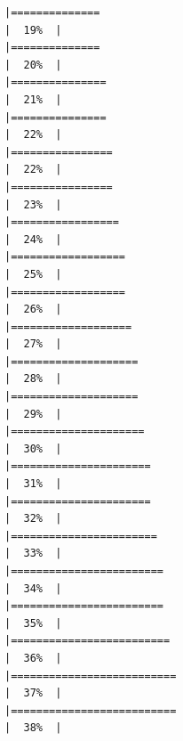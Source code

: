 \documentclass[
]{article}
\begin{document}
\begin{verbatim}
|==============                                                        |  19%  |                                                                              |==============                                                        |  20%  |                                                                              |===============                                                       |  21%  |                                                                              |===============                                                       |  22%  |                                                                              |================                                                      |  22%  |                                                                              |================                                                      |  23%  |                                                                              |=================                                                     |  24%  |                                                                              |==================                                                    |  25%  |                                                                              |==================                                                    |  26%  |                                                                              |===================                                                   |  27%  |                                                                              |====================                                                  |  28%  |                                                                              |====================                                                  |  29%  |                                                                              |=====================                                                 |  30%  |                                                                              |======================                                                |  31%  |                                                                              |======================                                                |  32%  |                                                                              |=======================                                               |  33%  |                                                                              |========================                                              |  34%  |                                                                              |========================                                              |  35%  |                                                                              |=========================                                             |  36%  |                                                                              |==========================                                            |  37%  |                                                                              |==========================                                            |  38%  |                                                                              
\end{verbatim}
\end{document}
